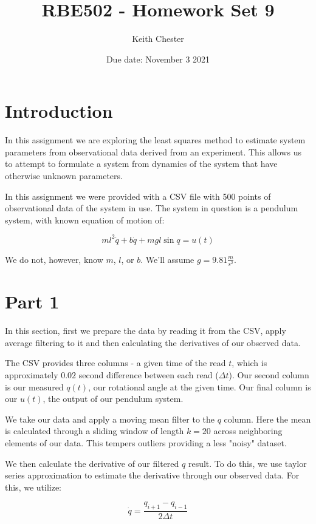 \documentclass{article}
\title{RBE502 - Homework Set 9}
\author{Keith Chester}
\date{Due date: November 3 2021}
\begin{document}
\maketitle

\section*{Introduction}

In this assignment we are exploring the least squares method to estimate system parameters from observational data derived from an experiment. This allows us to attempt to formulate a system from dynamics of the system that have otherwise unknown parameters.

In this assignment we were provided with a CSV file with 500 points of observational data of the system in use. The system in question is a pendulum system, with known equation of motion of:

\begin{equation}
    ml^2\ddot{q}+b\dot{q}+mgl\sin{q}=u(t)
\end{equation}

We do not, however, know $m$, $l$, or $b$. We'll assume $g=9.81\frac{m}{s^2}$.

\section*{Part 1}

In this section, first we prepare the data by reading it from the CSV, apply average filtering to it and then calculating the derivatives of our observed data.

The CSV provides three columns - a given time of the read $t$, which is approximately $0.02$ second difference between each read ($\Delta t$). Our second column is our measured $q(t)$, our rotational angle at the given time. Our final column is our $u(t)$, the output of our pendulum system.

We take our data and apply a moving mean filter to the $q$ column. Here the mean is calculated through a sliding window of length $k=20$ across neighboring elements of our data. This tempers outliers providing a less "noisy" dataset.

We then calculate the derivative of our filtered $q$ result. To do this, we use taylor series approximation to estimate the derivative through our observed data. For this, we utilize:

\begin{equation}
    \dot{q} = \frac{q_{i+1}-q_{i-1}}{2\Delta t}
\end{equation}
\end{document}
